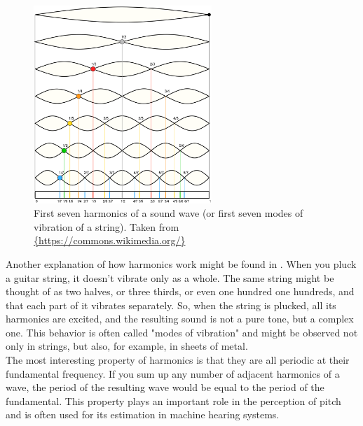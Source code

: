 \begin{figure}[h]
	\centering
	\includegraphics[width=0.6\textwidth]{include/harmonics}
	\caption[Harmonics of a sound wave]{First seven harmonics of a sound wave (or first seven modes of vibration of a string). Taken from \url{{https://commons.wikimedia.org/}}}
	\label{img:harmonics}
\end{figure}

Another explanation of how harmonics work might be found in \cite{Schnupp2011}. When you pluck a guitar string, it doesn't vibrate only as a whole. The same string might be thought of as two halves, or three thirds, or even one hundred one hundreds, and that each part of it vibrates separately. So, when the string is plucked, all its harmonics are excited, and the resulting sound is not a pure tone, but a complex one. This behavior is often called "modes of vibration" and might be observed not only in strings, but also, for example, in sheets of metal.\\

The most interesting property of harmonics is that they are all periodic at their fundamental frequency. If you sum up any number of adjacent harmonics of a wave, the period of the resulting wave would be equal to the period of the fundamental. This property plays an important role in the perception of pitch and is often used for its estimation in machine hearing systems.\\

